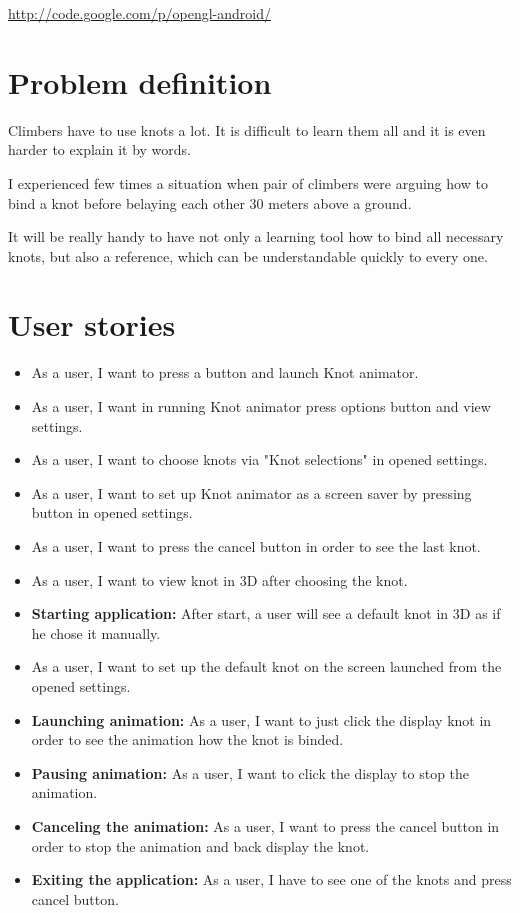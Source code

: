 \label{cha:Opengl-Android application}
\url{http://code.google.com/p/opengl-android/}

\section*{Problem definition} %
\label{sec:Problem definition}
Climbers have to use knots a lot. It is difficult to learn them all
and it is even harder to explain it by words.

I experienced few times a situation when pair of climbers
were arguing how to bind a knot before belaying each other
30 meters above a ground.

It will be really handy to have not only a learning tool
how to bind all necessary knots, but also a reference, 
which can be understandable quickly to every one.

\section*{User stories} %
\label{sec:User stories}
\begin{itemize}
  \item As a user, I want to press a button and launch Knot animator. 
  \item As a user, I want in running Knot animator press options button and view settings.
  \item As a user, I want to choose knots via "Knot selections" in opened settings.
  \item As a user, I want to set up Knot animator as a screen saver by pressing button in opened settings.
  \item As a user, I want to press the cancel button in order to see the last knot.
  \item As a user, I want to view knot in 3D after choosing the knot.
  \item {\bf Starting application:} After start, a user will see a default knot in 3D as if he chose it manually.
  \item As a user, I want to set up the default knot on the screen launched from the opened settings.
  \item {\bf Launching animation:}  As a user, I want to just click the display knot in order to see the animation how the knot is binded.
  \item {\bf Pausing animation:} As a user, I want to click the display to stop the animation.
  \item {\bf Canceling the animation:} As a user, I want to press the cancel button in order to stop the animation and back display the knot.
  \item {\bf Exiting the application:} As a user, I have to see one of the knots and press cancel button. 
\end{itemize}

